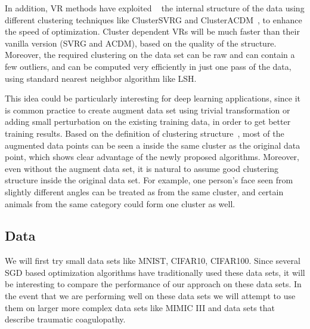\documentclass{article} %
\begin{document}
In addition, VR methods have exploited ~\cite{exploitingstructure,HLM2015} the internal structure of the data using different clustering techniques like ClusterSVRG and ClusterACDM~\cite{exploitingstructure}, to enhance the speed of optimization. Cluster dependent VRs will be much faster than their vanilla version (SVRG and ACDM), based on the quality of the structure.   
Moreover, the required clustering on the data set can be raw and can contain a few outliers, and can be computed very efficiently in just one pass of the data, using standard nearest neighbor algorithm like LSH. 

This idea could be particularly interesting for deep learning applications, since it is common practice to create augment data set using trivial transformation or adding small perturbation on the existing training data, in order to get better training results. Based on the definition of clustering structure~\cite{exploitingstructure}, most of the augmented data points can be seen a inside the same cluster as the original data point, which shows clear advantage of the newly proposed algorithms. Moreover, even without the augment data set, it is natural to assume good clustering structure inside the original data set. For example, one person's face seen from slightly different angles can be treated as from the same cluster, and certain animals from the same category could form one cluster as well. 



\subsection{Data}
We will first try small data sets like MNIST, CIFAR10, CIFAR100. Since several SGD based optimization algorithms  have traditionally used these data sets, it will be interesting to compare the performance of our approach on these data sets. In the event that we are performing well on these data sets we will attempt to use them on larger more complex data sets like MIMIC III \cite{mimiciii} and data sets that describe traumatic coagulopathy.
\end{document}
